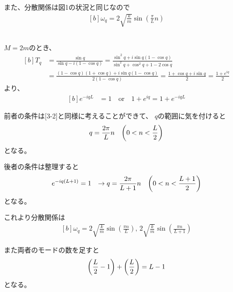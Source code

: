 \documentclass[../ap_2022.tex]{subfiles}
\begin{document}
また、分散関係は図1の状況と同じなので
\begin{equation}\begin{aligned}[b]
    \omega_q = 2\sqrt{\frac{k}{m}}\sin(\frac{\pi}{L}n)
\end{aligned}\end{equation}

\subsection{}
\(M=2m\)のとき、
\begin{equation}\begin{aligned}[b]
    T_q &= \frac{\sin q}{\sin q-i(1-\cos q)}
    = \frac{\sin^2 q+i\sin q(1-\cos q)}{\sin^2q+\cos^2q+1-2\cos q}\\
    &= \frac{(1-\cos q)(1+\cos q)+i\sin q(1-\cos q)}{2(1-\cos q)}
    =\frac{1+\cos q+i\sin q}{2}
    =\frac{1+e^{iq}}{2}
\end{aligned}\end{equation}
より、
\begin{equation}\begin{aligned}[b]
    e^{-iqL} &= 1\quad\text{or}\quad
        1+e^{iq} = 1+e^{-iqL}
\end{aligned}\end{equation}

前者の条件は[3-2]と同様に考えることができて、
\(q\)の範囲に気を付けると
\begin{equation}\begin{aligned}[b]
    q &= \frac{2\pi}{L}n & \qty(0< n < \frac{L}{2})
\end{aligned}\end{equation}
となる。

後者の条件は整理すると
\begin{equation}\begin{aligned}[b]
    e^{-iq(L+1)} &= 1&\rightarrow q &= \frac{2\pi}{L+1}n & \qty(0<n<\frac{L+1}{2})
\end{aligned}\end{equation}
となる。

これより分散関係は
\begin{equation}\begin{aligned}[b]
    \omega_q = 2\sqrt{\frac{k}{m}}\sin(\frac{\pi n}{L}),\,2\sqrt{\frac{k}{m}}\sin(\frac{\pi n}{L+1})
\end{aligned}\end{equation}

また両者のモードの数を足すと
\begin{equation}\begin{aligned}[b]
    \qty(\frac{L}{2}-1)+\qty(\frac{L}{2})=L-1
\end{aligned}\end{equation}
となる。
\end{document}
